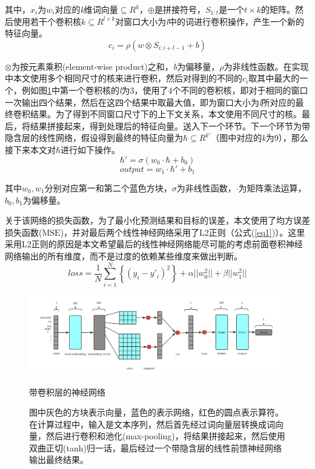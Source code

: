 其中，\(x_i\)为\(w_i\)对应的\textit{k}维词向量\(\subseteq R^k\)，\(\oplus\)是拼接符号，\(S_{1:t}\)是一个\(t\times k\)的矩阵。然后使用若干个卷积核\(k\subseteq R^{l\times k}\)对窗口大小为\textit{l}中的词进行卷积操作，产生一个新的特征向量。
\begin{equation}
c_i=\rho(w\otimes S_{i:i+l-1}+b)
\end{equation}

\(\otimes\)为按元素乘积(element-wise product)之和，\textit{b}为偏移量，\(\rho\)为非线性函数。在实现中本文使用多个相同尺寸的核来进行卷积，然后对得到的不同的\(c_i\)取其中最大的一个，例如图\ref{f21}中第一个卷积核的\textit{l}为3，使用了4个不同的卷积核，即对于相同的窗口一次输出四个结果，然后在这四个结果中取最大值，即为窗口大小为\textit{l}所对应的最终卷积结果。为了得到不同窗口尺寸下的上下文关系，本文使用不同尺寸的核。最后，将结果拼接起来，得到处理后的特征向量。送入下一个环节。下一个环节为带隐含层的线性网络，假设得到最终的特征向量为\(\hbar\subseteq R^{k'}\)（图中对应的\textit{k}为9），那么接下来本文对\(\hbar\)进行如下操作。
\begin{equation}
\hbar'=\sigma(w_0\cdot\hbar+b_0)
\end{equation}
\begin{equation}
output = w_1\cdot\hbar'+b_1
\end{equation}

其中\(w_0,w_1\)分别对应第一和第二个蓝色方块，\(\sigma\)为非线性函数，\(\cdot\)为矩阵乘法运算，\(b_0,b_1\)为偏移量。

关于该网络的损失函数，为了最小化预测结果和目标的误差，本文使用了均方误差损失函数($\mathrm{MSE}$)，并对最后两个线性神经网络采用了L2正则（公式(\ref{eq1})）。这里采用L2正则的原因是本文希望最后的线性神经网络能尽可能的考虑前面卷积神经网络输出的所有维度，而不是过度的依赖某些维度来做出判断。
\begin{equation}\label{eq1}
loss=\frac{1}{N}\displaystyle\sum_{i=1}^{N}\left\{(y_i-y'_i)^2\right\}+\alpha||w_0^2||+\beta||w_1^2||
\end{equation}
\begin{figure}[htbp]
    \centering
    \includegraphics[width=16cm]{conv_ranker.png}
    \caption{带卷积层的神经网络}
    \captionsetup{font=footnotesize,margin=30pt}\caption*{图中灰色的方块表示向量，蓝色的表示网络，红色的圆点表示算符。在计算过程中，输入是文本序列，然后首先经过词向量层转换成词向量，然后进行卷积和池化(max-pooling)，将结果拼接起来，然后使用双曲正切(tanh)归一话，最后经过一个带隐含层的线性前馈神经网络输出最终结果。}
    \label{f21}
\end{figure} 

